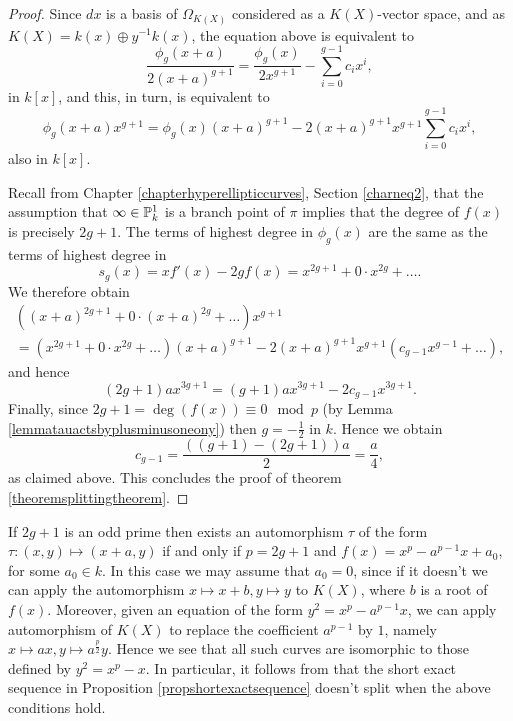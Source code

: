 \begin{proof}
    Since $dx$ is a basis of $\Omega_{K(X)}$ considered as a $K(X)$-vector space, and as $K(X) = k(x) \oplus y^{-1}k(x)$, the equation above is equivalent to
        \[
        \frac{\phi_g(x+a)}{2(x+a)^{g+1}} = \frac{\phi_g(x)}{2x^{g+1}} - \sum_{i=0}^{g-1} c_i x^i,
        \]
    in $k[x]$, and this, in turn, is equivalent to
        \[
        \phi_g(x+a)x^{g+1} = \phi_g(x)(x+a)^{g+1} - 2(x+a)^{g+1}x^{g+1}\sum_{i=0}^{g-1}c_i x^i,
        \]
    also in $k[x]$.

    Recall from Chapter \ref{chapterhyperellipticcurves}, Section \ref{charneq2}, that the assumption that $\infty \in {\mathbb P}_k^1$ is a branch point of $\pi$ implies that the degree of $f(x)$ is precisely $2g+1$.
    The terms of highest degree in $\phi_g(x)$ are the same as the terms of highest degree in 
        \[
        s_g(x) = xf'(x) - 2gf(x) = x^{2g+1} + 0\cdot x^{2g} + \ldots.
        \]
    We therefore obtain
        \begin{multline*}
        \left( (x+a)^{2g+1} + 0 \cdot (x+a)^{2g} + \ldots \right) x^{g+1}  \\ = (x^{2g+1} + 0 \cdot x^{2g} + \ldots )(x+a)^{g+1} - 2(x+a)^{g+1}x^{g+1}(c_{g-1}x^{g-1} + \ldots ),
        \end{multline*}
    and hence
        \[
        (2g+1)ax^{3g+1} = (g+1)ax^{3g+1} - 2c_{g-1}x^{3g+1}.
        \]
    Finally, since $2g + 1= \deg(f(x)) \equiv 0 \mod p$ (by Lemma \ref{lemmatauactsbyplusminusoneony}) then $g = -\frac{1}{2}$ in $k$.
    Hence we obtain
        \[
        c_{g-1} = \frac{((g+1) - (2g+1))a}{2} = \frac{a}{4},
        \]  
    as claimed above.
    This concludes the proof of theorem \ref{theoremsplittingtheorem}.
    \end{proof}

    \begin{ex}
    If $2g+1$ is an odd prime then exists an automorphism $\tau$ of the form $\tau\colon (x,y) \mapsto (x+a,y)$ if and only if $p=2g+1$ and $f(x) = x^p - a^{p-1}x + a_0$, for some $a_0 \in k$.
    In this case we may assume that $a_0 = 0$, since if it doesn't we can apply the automorphism $x \mapsto x+b, y\mapsto y$ to $K(X)$, where $b$ is a root of $f(x)$.
    Moreover, given an equation of the form $y^2 = x^p - a^{p-1}x$, we can apply automorphism of $K(X)$ to replace the coefficient $a^{p-1}$ by $1$, namely $x \mapsto ax, y \mapsto a^{\frac{p}{2}}y$.
    Hence we see that all such curves are isomorphic to those defined by $y^2 = x^p - x$.
    In particular, it follows from \cite[Thm.\ 3.1]{canonicalrepresentation} that the short exact sequence in Proposition \ref{propshortexactsequence} doesn't split when the above conditions hold.
    \end{ex}

